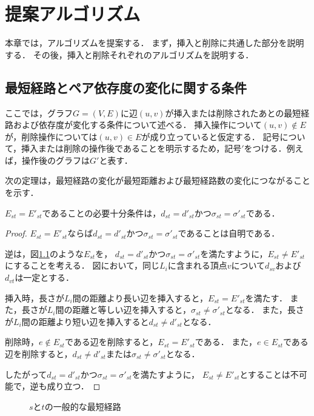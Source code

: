 \chapter{提案アルゴリズム}
\label{chap:algorithm}

本章では，アルゴリズムを提案する．
まず，挿入と削除に共通した部分を説明する．
その後，挿入と削除それぞれのアルゴリズムを説明する．

\section{最短経路とペア依存度の変化に関する条件}
\label{sect:condition-of-variability}

ここでは，グラフ$G=(V,E)$に辺$(u,v)$が挿入または削除されたあとの最短経路および依存度が変化する条件について述べる．
挿入操作について$(u,v)\notin E$が，削除操作については$(u,v)\in E$が成り立っていると仮定する．
記号について，挿入または削除の操作後であることを明示するため，記号$'$をつける．例えば，操作後のグラフは$G'$と表す．

次の定理は，最短経路の変化が最短距離および最短経路数の変化につながることを示す．
\begin{theorem}
  \label{thm:condition-of-invariability-of-shortest-path}
  $E_{st}=E'_{st}$であることの必要十分条件は，$d_{st}=d'_{st}$かつ$\sigma_{st}=\sigma'_{st}$である．
\end{theorem}
\begin{proof}
  $E_{st}=E'_{st}$ならば$d_{st}=d'_{st}$かつ$\sigma_{st}=\sigma'_{st}$であることは自明である．

  逆は，図\ref{fig:general-shortest-paths-weighted}のような$E_{st}$を，
  $d_{st}=d'_{st}$かつ$\sigma_{st}=\sigma'_{st}$を満たすように，$E_{st}\neq E'_{st}$にすることを考える．
  図において，同じ$L_i$に含まれる頂点$v$について$d_{sv}$および$d_{vt}$は一定とする．

  挿入時，長さが$L_i$間の距離より長い辺を挿入すると，$E_{st}=E'_{st}$を満たす．
  また，長さが$L_i$間の距離と等しい辺を挿入すると，$\sigma_{st}\neq\sigma'_{st}$となる．
  また，長さが$L_i$間の距離より短い辺を挿入すると$d_{st}\neq d'_{st}$となる．

  削除時，$e\notin E_{st}$である辺を削除すると，$E_{st}=E'_{st}$である．
  また，$e\in E_{st}$である辺を削除すると，$d_{st}\neq d'_{st}$または$\sigma_{st}\neq\sigma'_{st}$となる．

  したがって$d_{st}=d'_{st}$かつ$\sigma_{st}=\sigma'_{st}$を満たすように，
  $E_{st}\neq E'_{st}$とすることは不可能で，逆も成り立つ．

\end{proof}
\begin{figure}
  \centering
  \def\svgwidth{.5\columnwidth}
  
  \caption{$s$と$t$の一般的な最短経路}
  \label{fig:general-shortest-paths-weighted}
\end{figure}

